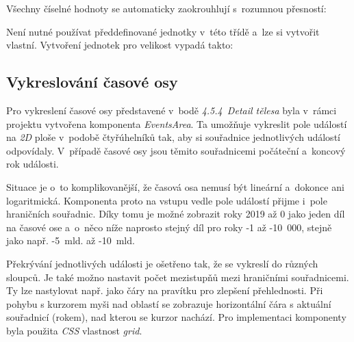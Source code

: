 \documentclass[a4paper,12pt]{article}
\begin{document}


Všechny číselné hodnoty se automaticky zaokrouhlují s~rozumnou přesností:



Není nutné používat předdefinované jednotky v~této třídě a~lze si vytvořit vlastní. Vytvoření jednotek pro velikost vypadá takto:



\subsection{Vykreslování časové osy}

Pro vykreslení časové osy představené v~bodě \textit{4.5.4~Detail tělesa} byla v~rámci projektu vytvořena komponenta \textit{EventsArea}. Ta umožňuje vykreslit pole událostí na \textit{2D} ploše v~podobě čtyřúhelníků tak, aby si souřadnice jednotlivých událostí odpovídaly. V~případě časové osy jsou těmito souřadnicemi počáteční a~koncový rok události.

Situace je o~to komplikovanější, že časová osa nemusí být lineární a~dokonce ani logaritmická. Komponenta proto na vstupu vedle pole událostí přijme i~pole hraničních souřadnic. Díky tomu je možné zobrazit roky 2019 až 0 jako jeden díl na časové ose a~o~něco níže naprosto stejný díl pro roky -1 až -10~000, stejně jako např. -5~mld. až -10~mld.

Překrývání jednotlivých události je ošetřeno tak, že se vykreslí do různých sloupců. Je také možno nastavit počet mezistupňů mezi hraničními souřadnicemi. Ty lze nastylovat např. jako čáry na pravítku pro zlepšení přehlednosti. Při pohybu s kurzorem myši nad oblastí se zobrazuje horizontální čára s aktuální souřadnicí (rokem), nad kterou se kurzor nachází. Pro implementaci komponenty byla použita \textit{CSS} vlastnost \textit{grid}.





\clearpage {} {}
\end{document}
